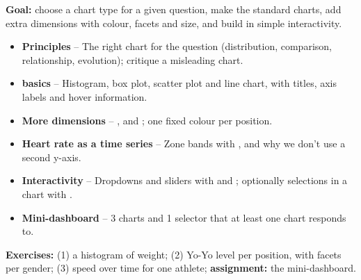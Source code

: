 \textbf{Goal:} choose a chart type for a given question, make the
standard  charts, add extra dimensions with colour,
facets and size, and build in simple interactivity.

\begin{itemize}
  \item \textbf{Principles} -- The right chart for the question (distribution, comparison, relationship, evolution); critique a misleading chart.
  \item \textbf{ basics} -- Histogram, box plot, scatter plot and line chart, with titles, axis labels and hover information.
  \item \textbf{More dimensions} -- ,  and ; one fixed colour per position.
  \item \textbf{Heart rate as a time series} -- Zone bands with , and why we don't use a second y-axis.
  \item \textbf{Interactivity} -- Dropdowns and sliders with  and ; optionally selections in a chart with .
  \item \textbf{Mini-dashboard} -- 3 charts and 1 selector that at least one chart responds to.
\end{itemize}

\textbf{Exercises:} (1) a histogram of weight; (2) Yo-Yo level per
position, with facets per gender; (3) speed over time for one athlete;
\textbf{assignment:} the mini-dashboard.
